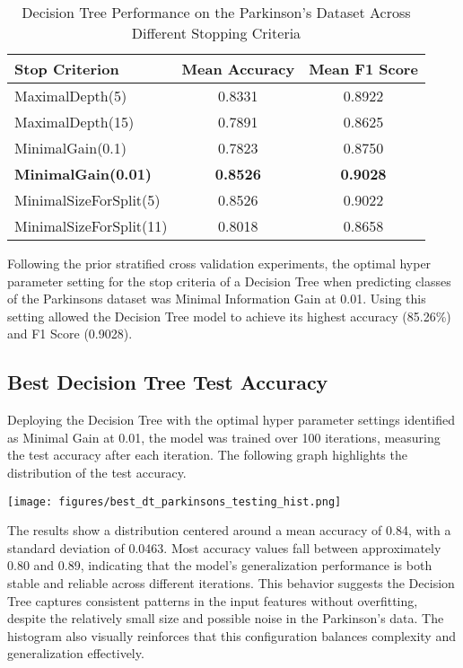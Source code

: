\documentclass[letterpaper]{article}
\begin{document}
\begin{table}[h]
\centering
\begin{tabular}{|l|c|c|}
\hline
\textbf{Stop Criterion} & \textbf{Mean Accuracy} & \textbf{Mean F1 Score} \\
\hline
MaximalDepth(5)             & 0.8331 & 0.8922 \\
MaximalDepth(15)            & 0.7891 & 0.8625 \\
MinimalGain(0.1)            & 0.7823 & 0.8750 \\
\textbf{MinimalGain(0.01)}  & \textbf{0.8526} & \textbf{0.9028} \\
MinimalSizeForSplit(5)      & 0.8526 & 0.9022 \\
MinimalSizeForSplit(11)     & 0.8018 & 0.8658 \\
\hline
\end{tabular}
\caption{Decision Tree Performance on the Parkinson's Dataset Across Different Stopping Criteria}
\label{tab:dt_parkinsons_results}
\end{table}


Following the prior stratified cross validation experiments, the optimal hyper parameter setting for the stop criteria of a Decision Tree when predicting classes of the Parkinsons dataset was Minimal Information Gain at 0.01. Using this setting allowed the Decision Tree model to achieve its highest accuracy (85.26\%) and F1 Score (0.9028).

\subsection*{Best Decision Tree Test Accuracy}

Deploying the Decision Tree with the optimal hyper parameter settings identified as Minimal Gain at 0.01, the model was trained over 100 iterations, measuring the test accuracy after each iteration. The following graph highlights the distribution of the test accuracy.

\vspace{0.2in}
    \begin{minipage}{\linewidth}
        \centering
        \texttt{[image: figures/best\_dt\_parkinsons\_testing\_hist.png]}
    \end{minipage}
\vspace{0.1in}


The results show a distribution centered around a mean accuracy of 0.84, with a standard deviation of 0.0463. Most accuracy values fall between approximately 0.80 and 0.89, indicating that the model's generalization performance is both stable and reliable across different iterations. This behavior suggests the Decision Tree captures consistent patterns in the input features without overfitting, despite the relatively small size and possible noise in the Parkinson’s data. The histogram also visually reinforces that this configuration balances complexity and generalization effectively.
\end{document}
